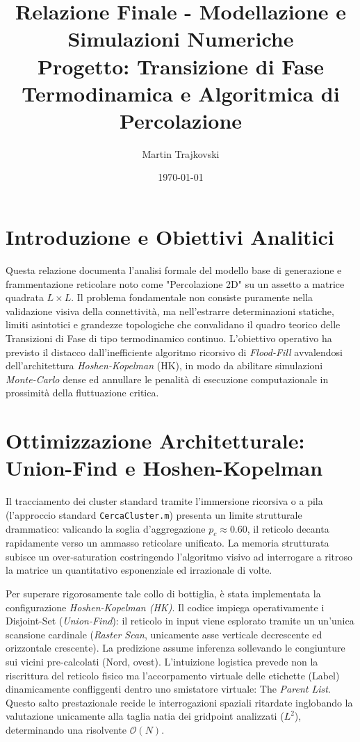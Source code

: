 \documentclass[11pt,a4paper]{article}
\title{Relazione Finale - Modellazione e Simulazioni Numeriche \\ \large Progetto: Transizione di Fase Termodinamica e Algoritmica di Percolazione}
\author{Martin Trajkovski}
\date{\today}
\begin{document}
\maketitle

\section{Introduzione e Obiettivi Analitici}
Questa relazione documenta l'analisi formale del modello base di generazione e frammentazione reticolare noto come "Percolazione 2D" su un assetto a matrice quadrata $L \times L$. Il problema fondamentale non consiste puramente nella validazione visiva della connettività, ma nell'estrarre determinazioni statiche, limiti asintotici e grandezze topologiche che convalidano il quadro teorico delle Transizioni di Fase di tipo termodinamico continuo. L'obiettivo operativo ha previsto il distacco dall'inefficiente algoritmo ricorsivo di \textit{Flood-Fill} avvalendosi dell'architettura \textit{Hoshen-Kopelman} (HK), in modo da abilitare simulazioni \textit{Monte-Carlo} dense ed annullare le penalità di esecuzione computazionale in prossimità della fluttuazione critica.

\section{Ottimizzazione Architetturale: Union-Find e Hoshen-Kopelman}
Il tracciamento dei cluster standard tramite l'immersione ricorsiva o a pila (l'approccio standard \texttt{CercaCluster.m}) presenta un limite strutturale drammatico: valicando la soglia d'aggregazione $p_c \approx 0.60$, il reticolo decanta rapidamente verso un ammasso reticolare unificato. La memoria strutturata subisce un over-saturation costringendo l'algoritmo visivo ad interrogare a ritroso la matrice un quantitativo esponenziale ed irrazionale di volte.

Per superare rigorosamente tale collo di bottiglia, è stata implementata la configurazione \textit{Hoshen-Kopelman (HK)}.
Il codice impiega operativamente i Disjoint-Set (\textit{Union-Find}): il reticolo in input viene esplorato tramite un un'unica scansione cardinale (\textit{Raster Scan}, unicamente asse verticale decrescente ed orizzontale crescente). La predizione assume inferenza sollevando le congiunture sui vicini pre-calcolati (Nord, ovest). L'intuizione logistica prevede non la riscrittura del reticolo fisico ma l'accorpamento virtuale delle etichette (Label) dinamicamente confliggenti dentro uno smistatore virtuale: The \textit{Parent List}. Questo salto prestazionale recide le interrogazioni spaziali ritardate inglobando la valutazione unicamente alla taglia natia dei gridpoint analizzati ($L^2$), determinando una risolvente $\mathcal{O}(N)$.
\end{document}
